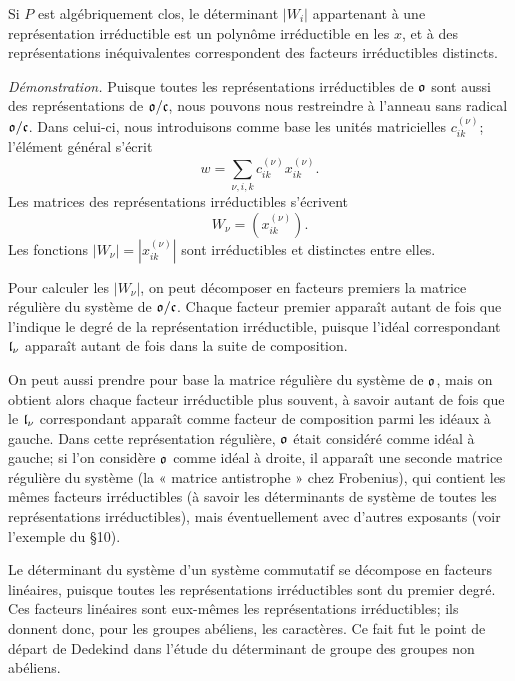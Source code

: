Si $P$ est algébriquement clos, le déterminant $|W_i|$ appartenant à une représentation irréductible est un polynôme irréductible en les $x$, et à des représentations inéquivalentes correspondent des facteurs irréductibles distincts.

\emph{Démonstration.} Puisque toutes les représentations irréductibles de $\mathfrak{o}$ sont aussi des représentations de $\mathfrak{o}/\mathfrak{c}$, nous pouvons nous restreindre à l'anneau sans radical $\mathfrak{o}/\mathfrak{c}$. Dans celui-ci, nous introduisons comme base les unités matricielles $c_{ik}^{(\nu)}$; l'élément général s'écrit
\[
        w=\sum_{\nu,i,k}c_{ik}^{(\nu)}x_{ik}^{(\nu)}.
\]
Les matrices des représentations irréductibles s'écrivent
\[
        W_\nu=(x_{ik}^{(\nu)}).
\]
Les fonctions $|W_\nu|=|x_{ik}^{(\nu)}|$ sont irréductibles et distinctes entre elles.

Pour calculer les $|W_\nu|$, on peut décomposer en facteurs premiers la matrice régulière du système de $\mathfrak{o}/\mathfrak{c}$. Chaque facteur premier apparaît autant de fois que l'indique le degré de la représentation irréductible, puisque l'idéal correspondant $\mathfrak{l}_\nu$ apparaît autant de fois dans la suite de composition.

On peut aussi prendre pour base la matrice régulière du système de $\mathfrak{o}$, mais on obtient alors chaque facteur irréductible plus souvent, à savoir autant de fois que le $\mathfrak{l}_\nu$ correspondant apparaît comme facteur de composition parmi les idéaux à gauche. Dans cette représentation régulière, $\mathfrak{o}$ était considéré comme idéal à gauche; si l'on considère $\mathfrak{o}$ comme idéal à droite, il apparaît une seconde matrice régulière du système (la « matrice antistrophe » chez Frobenius), qui contient les mêmes facteurs irréductibles (à savoir les déterminants de système de toutes les représentations irréductibles), mais éventuellement avec d'autres exposants (voir l'exemple du \S{}10).

Le déterminant du système d'un système commutatif se décompose en facteurs linéaires, puisque toutes les représentations irréductibles sont du premier degré. Ces facteurs linéaires sont eux-mêmes les représentations irréductibles; ils donnent donc, pour les groupes abéliens, les caractères. Ce fait fut le point de départ de Dedekind dans l'étude du déterminant de groupe des groupes non abéliens.
